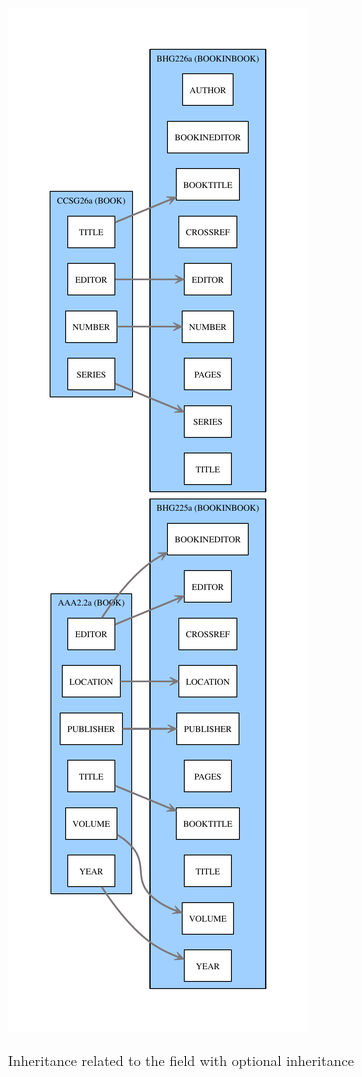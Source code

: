 \documentclass{ltxdockit}[2011/03/25]
\begin{document}
\begin{figure}
  \centering
  \includegraphics[height=0.99\textheight]{example-bookineditor-BookineditorFromEditor.pdf}
  \label{example-bookineditor-BookineditorFromEditor}
  \caption{Inheritance related to the  field with optional inheritance}
\end{figure}
\end{document}
